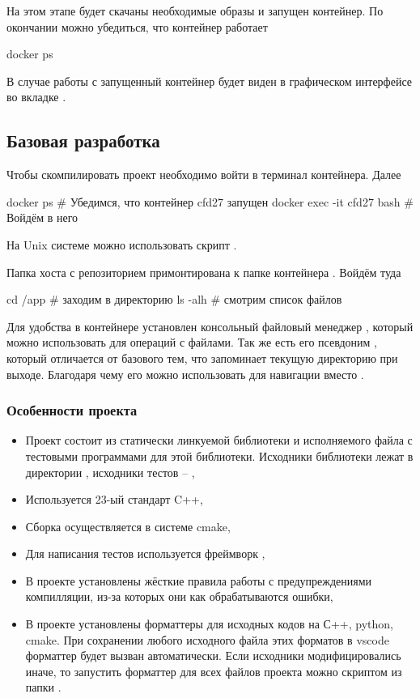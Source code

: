 На этом этапе будет скачаны необходимые образы и запущен контейнер.
По окончании можно убедиться, что контейнер работает
\begin{shelloutput}
docker ps
\end{shelloutput}
В случае работы с  запущенный контейнер будет виден в графическом интерфейсе во вкладке .

\subsection{Базовая разработка}
\label{sec:howto_basic_dev}
Чтобы скомпилировать проект необходимо войти в терминал контейнера.
Далее
\begin{shelloutput}
docker ps                   # Убедимся, что контейнер cfd27 запущен
docker exec -it cfd27 bash  # Войдём в него
\end{shelloutput}

На Unix системе можно использовать скрипт .

Папка хоста с репозиторием  примонтирована к папке контейнера .
Войдём туда
\begin{shelloutput}
cd /app   # заходим в директорию
ls -alh   # смотрим список файлов
\end{shelloutput}
Для удобства в контейнере установлен консольный файловый менеджер ,
который можно использовать для операций с файлами. Так же есть его псевдоним ,
который отличается от базового  тем, что запоминает текущую директорию при выходе.
Благодаря чему его можно использовать для навигации вместо .


\subsubsection{Особенности проекта}
\begin{itemize}
\item Проект состоит из статически линкуемой библиотеки  и исполняемого файла  с тестовыми программами для этой библиотеки.
      Исходники библиотеки лежат в директории , исходники тестов -- ,
\item Используется 23-ый стандарт C++,
\item Сборка осуществляется в системе cmake,
\item Для написания тестов используется фреймворк ,
\item В проекте установлены жёсткие правила работы с предупреждениями компилляции, из-за которых они как обрабатываются ошибки,
\item В проекте установлены форматтеры для исходных кодов на С++, python, cmake. При сохранении любого исходного файла этих форматов в vscode
      форматтер будет вызван автоматически. Если исходники модифицировались иначе, то запустить форматтер для всех файлов проекта
      можно скриптом  из папки .
\end{itemize}


